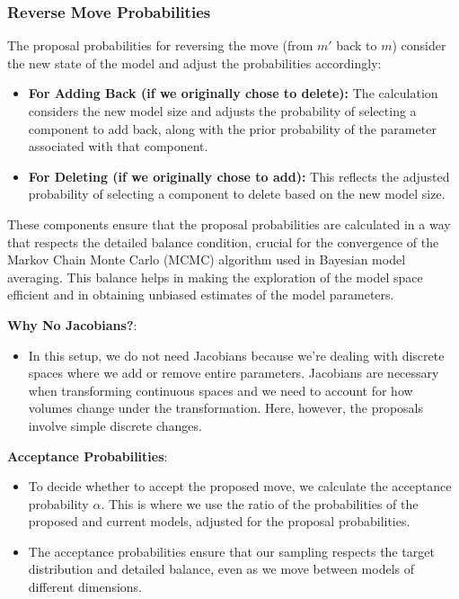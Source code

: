 \documentclass[10pt]{article}
\begin{document}
\subsubsection*{Reverse Move Probabilities}
The proposal probabilities for reversing the move (from \(m'\) back to \(m\)) consider the new state of the model and adjust the probabilities accordingly:

\begin{itemize}
  \item \textbf{For Adding Back (if we originally chose to delete):} The calculation considers the new model size and adjusts the probability of selecting a component to add back, along with the prior probability of the parameter associated with that component.

  \item \textbf{For Deleting (if we originally chose to add):} This reflects the adjusted probability of selecting a component to delete based on the new model size.

\end{itemize}

These components ensure that the proposal probabilities are calculated in a way that respects the detailed balance condition, crucial for the convergence of the Markov Chain Monte Carlo (MCMC) algorithm used in Bayesian model averaging. This balance helps in making the exploration of the model space efficient and in obtaining unbiased estimates of the model parameters.

\textbf{Why No Jacobians?}:

\begin{itemize}
  \item In this setup, we do not need Jacobians because we're dealing with discrete spaces where we add or remove entire parameters. Jacobians are necessary when transforming continuous spaces and we need to account for how volumes change under the transformation. Here, however, the proposals involve simple discrete changes.
\end{itemize}

\textbf{Acceptance Probabilities}:

\begin{itemize}
  \item To decide whether to accept the proposed move, we calculate the acceptance probability \( \alpha \). This is where we use the ratio of the probabilities of the proposed and current models, adjusted for the proposal probabilities.
  \item The acceptance probabilities ensure that our sampling respects the target distribution and detailed balance, even as we move between models of different dimensions.
\end{itemize}
\end{document}
